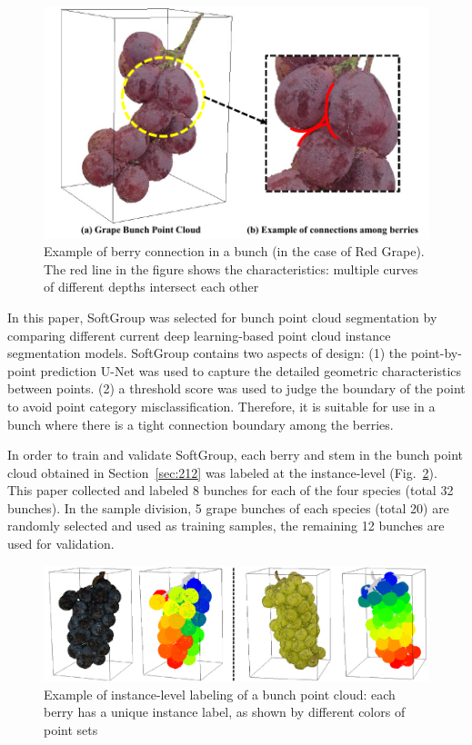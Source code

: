 \documentclass[12pt]{article}
\begin{document}
\begin{figure}[hbt!]
    \centering
    \includegraphics[width=1\textwidth]{figures/Figure5.pdf}
    \caption{Example of berry connection in a bunch (in the case of Red Grape). The red line in the figure shows the characteristics: multiple curves of different depths intersect each other}
    \label{fig:raw2}
\end{figure}

In this paper, SoftGroup \citep{vu_softgroup_2022} was selected for bunch point cloud segmentation by comparing different current deep learning-based point cloud instance segmentation models. 
SoftGroup contains two aspects of design: 
(1) the point-by-point prediction U-Net was used to capture the detailed geometric characteristics between points. 
(2) a threshold score was used to judge the boundary of the point to avoid point category misclassification. 
Therefore, it is suitable for use in a bunch where there is a tight connection boundary among the berries.

In order to train and validate SoftGroup, each berry and stem in the bunch point cloud obtained in Section~\ref{sec:212} was labeled at the instance-level (Fig.~\ref{fig:raw11}). 
This paper collected and labeled 8 bunches for each of the four species (total 32 bunches). 
In the sample division, 5 grape bunches of each species (total 20) are randomly selected and used as training samples, the remaining 12 bunches are used for validation.

\begin{figure}[hbt!]
    \centering
    \includegraphics[width=1\textwidth]{figures/Figure6.pdf}
    \caption{Example of instance-level labeling of a bunch point cloud: each berry has a unique instance label, as shown by different colors of point sets}
    \label{fig:raw11}
\end{figure}
\end{document}
